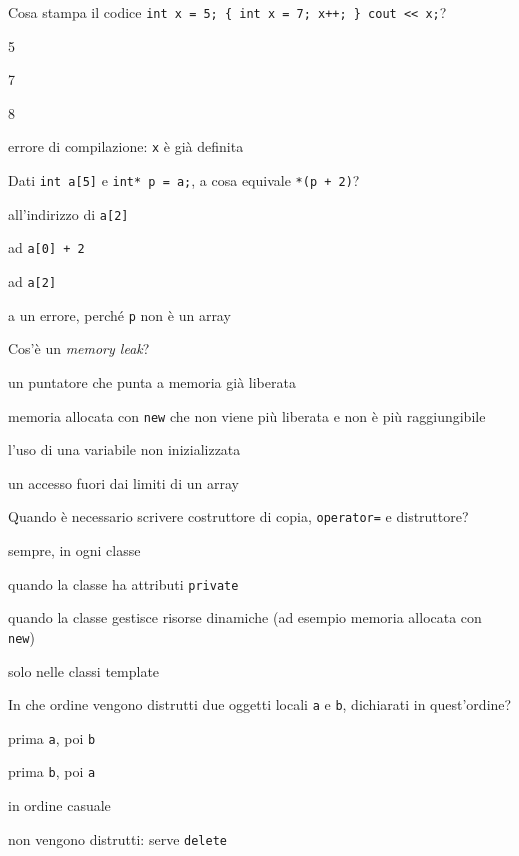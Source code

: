 \begin{quiz}{Cosa stampa il codice \texttt{int x = 5; \{ int x = 7; x++; \} cout << x;}?}
  \item 5
  \item 7
  \item 8
  \item errore di compilazione: \texttt{x} è già definita
\end{quiz}

\begin{quiz}{Dati \texttt{int a[5]} e \texttt{int* p = a;}, a cosa equivale \texttt{*(p + 2)}?}
  \item all'indirizzo di \texttt{a[2]}
  \item ad \texttt{a[0] + 2}
  \item ad \texttt{a[2]}
  \item a un errore, perché \texttt{p} non è un array
\end{quiz}

\begin{quiz}{Cos'è un \emph{memory leak}?}
  \item un puntatore che punta a memoria già liberata
  \item memoria allocata con \texttt{new} che non viene più liberata e non è più raggiungibile
  \item l'uso di una variabile non inizializzata
  \item un accesso fuori dai limiti di un array
\end{quiz}

\begin{quiz}{Quando è necessario scrivere costruttore di copia, \texttt{operator=} e distruttore?}
  \item sempre, in ogni classe
  \item quando la classe ha attributi \texttt{private}
  \item quando la classe gestisce risorse dinamiche (ad esempio memoria allocata con \texttt{new})
  \item solo nelle classi template
\end{quiz}

\begin{quiz}{In che ordine vengono distrutti due oggetti locali \texttt{a} e \texttt{b}, dichiarati in quest'ordine?}
  \item prima \texttt{a}, poi \texttt{b}
  \item prima \texttt{b}, poi \texttt{a}
  \item in ordine casuale
  \item non vengono distrutti: serve \texttt{delete}
\end{quiz}

